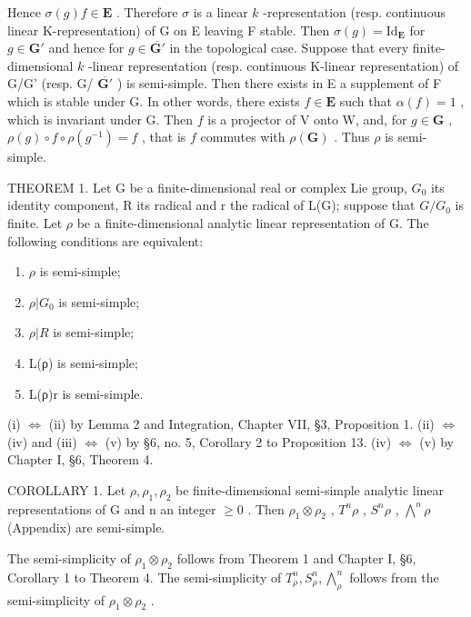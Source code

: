 Hence \(\sigma(g)f\in\mathbf{E}\) . Therefore \(\sigma\) is a linear \(k\) -representation (resp. continuous linear K-representation) of G on E leaving F stable. Then \(\sigma(g)=\mathrm{Id}_{\mathbf{E}}\) for \(g\in\mathbf{G}'\) and hence for \(g\in\overline{\mathbf{G}'}\) in the topological case. Suppose that every finite-dimensional \(k\) -linear representation (resp. continuous K-linear representation) of G/G' (resp. G/ \(\overline{\mathbf{G}'}\) ) is semi-simple. Then there exists in E a supplement of F which is stable under G. In other words, there exists \(f\in\mathbf{E}\) such that \(\alpha(f)=1\) , which is invariant under G. Then \(f\) is a projector of V onto W, and, for \(g\in\mathbf{G}\) , \(\rho(g)\circ f\circ\rho(g^{-1})=f\) , that is \(f\) commutes with \(\rho(\mathbf{G})\) . Thus \(\rho\) is semi-simple.

THEOREM 1. Let G be a finite-dimensional real or complex Lie group, \(G_{0}\) its identity component, R its radical and r the radical of L(G); suppose that \(G/G_{0}\) is finite. Let \(\rho\) be a finite-dimensional analytic linear representation of G. The following conditions are equivalent:

\begin{enumerate}
\def\labelenumi{(\roman{enumi})}
\item
  \(\rho\) is semi-simple;
\item
  \(\rho|G_{0}\) is semi-simple;
\item
  \(\rho|R\) is semi-simple;
\item
  L(ρ) is semi-simple;
\item
  L(ρ)\textbar r is semi-simple.
\end{enumerate}

(i) \(\Leftrightarrow\) (ii) by Lemma 2 and Integration, Chapter VII, §3, Proposition 1. (ii) \(\Leftrightarrow\) (iv) and (iii) \(\Leftrightarrow\) (v) by §6, no. 5, Corollary 2 to Proposition 13. (iv) \(\Leftrightarrow\) (v) by Chapter I, §6, Theorem 4.

COROLLARY 1. Let \(\rho, \rho_{1}, \rho_{2}\) be finite-dimensional semi-simple analytic linear representations of G and n an integer \(\geqslant 0\) . Then \(\rho_{1} \otimes \rho_{2}\) , \(T^{n}\rho\) , \(S^{n}\rho\) , \(\bigwedge^{n}\rho\) (Appendix) are semi-simple.

The semi-simplicity of \(\rho_{1} \otimes \rho_{2}\) follows from Theorem 1 and Chapter I, §6, Corollary 1 to Theorem 4. The semi-simplicity of \(T^{n}_{\rho}, S^{n}_{\rho}, \bigwedge^{n}_{\rho}\) follows from the semi-simplicity of \(\rho_{1} \otimes \rho_{2}\) .

